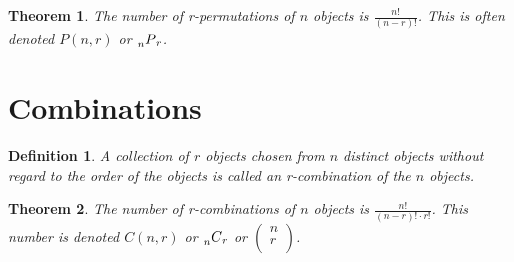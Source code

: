 \documentclass{report}
\newtheorem{theorem}{Theorem}[section]
\newtheorem{definition}{Definition}[section]
\begin{document}
\begin{theorem}
  The number of r-permutations of $n$ objects is $\frac{n!}{(n-r)!}$. This is
  often denoted $P(n,r)$ or $\prescript{}{n}{P}_r$.
\end{theorem}

\section{Combinations}
\label{sec:combinations}

\begin{definition}
   A collection of $r$ objects chosen from $n$ distinct objects without regard
   to the order of the objects is called an \textit{r-combination} of the $n$
   objects.
\end{definition}

\begin{theorem}
  The number of r-combinations of $n$ objects is $\frac{n!}{(n-r)!\cdot r!}$.
  This number is denoted $C(n,r)$ or $\prescript{}{n}{C}_r$ or
  $\left(\begin{array}{c}
    n \\
    r \\
  \end{array}\right)$.
\end{theorem}
\end{document}
